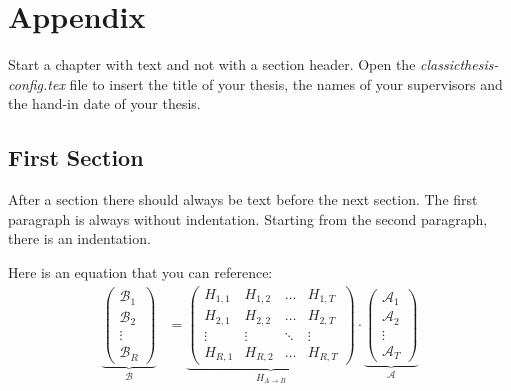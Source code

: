 
\chapter{Appendix}\label{ch:Appendix}

\glsresetall %



Start a chapter with text and not with a section header. Open the
\emph{classicthesis-config.tex} file to insert the title of your thesis, the
names of your supervisors and the hand-in date of your thesis.



\section{First Section}
\label{sec:first_section}

After a section there should always be text before the next section. The first
paragraph is always without indentation. Starting from the second paragraph,
there is an indentation.

Here is an equation that you can reference:
\begin{align}
	\underbrace{\begin{pmatrix}\mathcal{B}_1\\\mathcal{B}_2\\\vdots\\\mathcal{B}_R\end{pmatrix}}_\mathcal{B} &= \underbrace{\begin{pmatrix}H_{1,1} & H_{1,2} & \hdots & H_{1,T}\\H_{2,1} & H_{2,2} & \hdots & H_{2,T}\\\vdots & \vdots & \ddots & \vdots\\H_{R,1} & H_{R,2} & \hdots & H_{R,T}\end{pmatrix}}_{H_{A\rightarrow B}}\cdot \underbrace{\begin{pmatrix}\mathcal{A}_1\\\mathcal{A}_2\\\vdots\\\mathcal{A}_T\end{pmatrix}}_\mathcal{A}\label{eqn:example}
\end{align}


